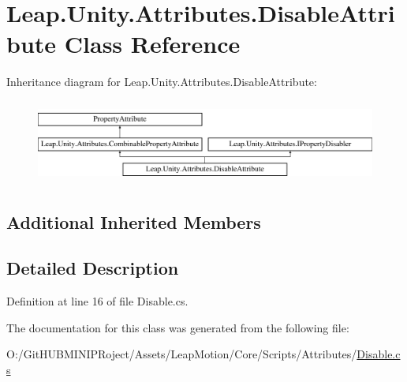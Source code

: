 \hypertarget{class_leap_1_1_unity_1_1_attributes_1_1_disable_attribute}{}\section{Leap.\+Unity.\+Attributes.\+Disable\+Attribute Class Reference}
\label{class_leap_1_1_unity_1_1_attributes_1_1_disable_attribute}
Inheritance diagram for Leap.\+Unity.\+Attributes.\+Disable\+Attribute\+:\begin{figure}[H]
\begin{center}
\leavevmode
\includegraphics[height=2.772277cm]{class_leap_1_1_unity_1_1_attributes_1_1_disable_attribute}
\end{center}
\end{figure}
\subsection*{Additional Inherited Members}


\subsection{Detailed Description}


Definition at line 16 of file Disable.\+cs.



The documentation for this class was generated from the following file\+:\begin{DoxyCompactItemize}
\item 
O\+:/\+Git\+H\+U\+B\+M\+I\+N\+I\+P\+Roject/\+Assets/\+Leap\+Motion/\+Core/\+Scripts/\+Attributes/\mbox{\hyperlink{_disable_8cs}{Disable.\+cs}}\end{DoxyCompactItemize}
